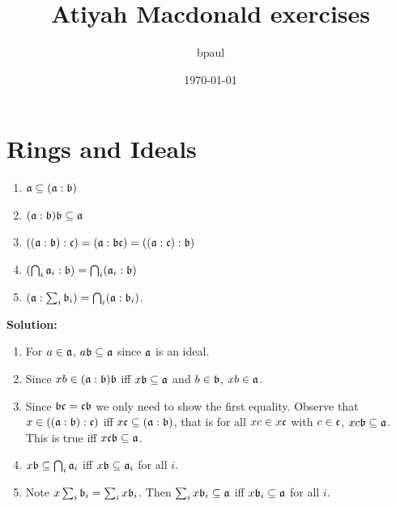 \documentclass{article}
\title{Atiyah Macdonald exercises}
\author{bpaul}
\date{\today}
\begin{document}
\maketitle

\section{Rings and Ideals}

\renewcommand{\theexercise}{\thesection.\arabic{exercise}}

\setcounter{exercise}{11}

\begin{exercise}
    \begin{enumerate}
        \item \(\mathfrak{a} \subseteq (\mathfrak{a} : \mathfrak{b})\)
        \item \((\mathfrak{a} : \mathfrak{b}) \mathfrak{b} \subseteq \mathfrak{a}\)
        \item \(((\mathfrak{a} : \mathfrak{b}) : \mathfrak{c}) = (\mathfrak{a} : \mathfrak{b} \mathfrak{c}) = ((\mathfrak{a} : \mathfrak{c}) : \mathfrak{b})\)
        \item \((\bigcap_i \mathfrak{a}_i : \mathfrak{b}) = \bigcap_i (\mathfrak{a}_i : \mathfrak{b})\)
        \item \((\mathfrak{a} : \sum_i \mathfrak{b}_i) = \bigcap_i (\mathfrak{a} : \mathfrak{b}_i)\).
    \end{enumerate}
\end{exercise}

\noindent\textbf{Solution:}
\begin{enumerate}
    \item
        For \(a \in \mathfrak{a}\), \(a \mathfrak{b} \subseteq \mathfrak{a}\) since \(\mathfrak{a}\) is an ideal.
    \item
        Since \(xb \in (\mathfrak{a} : \mathfrak{b}) \mathfrak{b}\) iff \(x \mathfrak{b} \subseteq \mathfrak{a}\) and \(b \in \mathfrak{b}\), \(xb \in \mathfrak{a}\).
    \item
        Since \(\mathfrak{b} \mathfrak{c} = \mathfrak{c} \mathfrak{b}\) we only need to show the first equality.
        Observe that \(x \in ((\mathfrak{a} : \mathfrak{b}) : \mathfrak{c})\) iff \(x \mathfrak{c} \subseteq (\mathfrak{a} : \mathfrak{b})\), that is for all \(xc \in x \mathfrak{c}\) with \(c \in \mathfrak{c}\), \(xc \mathfrak{b} \subseteq \mathfrak{a}\).
        This is true iff \(x \mathfrak{c} \mathfrak{b} \subseteq \mathfrak{a}\).
    \item
        \(x \mathfrak{b} \subseteq \bigcap_i \mathfrak{a}_i\) iff \(x \mathfrak{b} \subseteq \mathfrak{a}_i\) for all \(i\).
    \item
        Note \(x \sum_i \mathfrak{b}_i = \sum_i x \mathfrak{b}_i\).
        Then \(\sum_i x \mathfrak{b}_i \subseteq \mathfrak{a}\) iff \(x \mathfrak{b}_i \subseteq \mathfrak{a}\) for all \(i\).
\end{enumerate}
\end{document}
